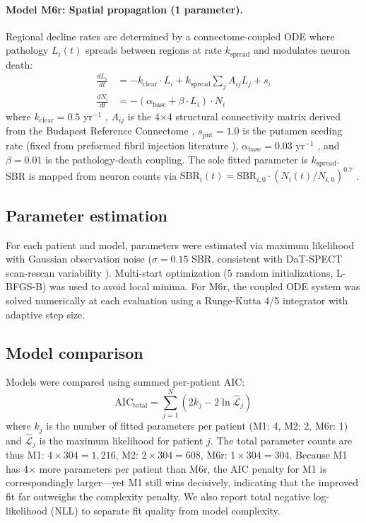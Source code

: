 \paragraph{Model M6r: Spatial propagation (1 parameter).}
Regional decline rates are determined by a connectome-coupled ODE where pathology $L_i(t)$ spreads between regions at rate $k_{\text{spread}}$ and modulates neuron death:
\begin{align}
\frac{dL_i}{dt} &= -k_{\text{clear}} \cdot L_i + k_{\text{spread}} \sum_j A_{ij} L_j + s_i \\
\frac{dN_i}{dt} &= -(\alpha_{\text{base}} + \beta \cdot L_i) \cdot N_i
\end{align}
where $k_{\text{clear}} = 0.5$ yr$^{-1}$ \cite{xu2024}, $A_{ij}$ is the 4$\times$4 structural connectivity matrix derived from the Budapest Reference Connectome \cite{schafer2021}, $s_{\text{put}} = 1.0$ is the putamen seeding rate (fixed from preformed fibril injection literature \cite{chu2019, patterson2019}), $\alpha_{\text{base}} = 0.03$ yr$^{-1}$ \cite{fearnley1991}, and $\beta = 0.01$ is the pathology-death coupling. The sole fitted parameter is $k_{\text{spread}}$. SBR is mapped from neuron counts via $\text{SBR}_i(t) = \text{SBR}_{i,0} \cdot (N_i(t)/N_{i,0})^{0.7}$ \cite{lee2019}.

\subsection{Parameter estimation}

For each patient and model, parameters were estimated via maximum likelihood with Gaussian observation noise ($\sigma = 0.15$ SBR, consistent with DaT-SPECT scan-rescan variability \cite{tossicibolt2017}). Multi-start optimization (5 random initializations, L-BFGS-B) was used to avoid local minima. For M6r, the coupled ODE system was solved numerically at each evaluation using a Runge-Kutta 4/5 integrator with adaptive step size.

\subsection{Model comparison}

Models were compared using summed per-patient AIC:
\begin{equation}
\text{AIC}_{\text{total}} = \sum_{j=1}^{N} \left( 2 k_j - 2 \ln \hat{\mathcal{L}}_j \right)
\end{equation}
where $k_j$ is the number of fitted parameters per patient (M1: 4, M2: 2, M6r: 1) and $\hat{\mathcal{L}}_j$ is the maximum likelihood for patient $j$. The total parameter counts are thus M1: $4 \times 304 = 1{,}216$, M2: $2 \times 304 = 608$, M6r: $1 \times 304 = 304$. Because M1 has 4$\times$ more parameters per patient than M6r, the AIC penalty for M1 is correspondingly larger---yet M1 still wins decisively, indicating that the improved fit far outweighs the complexity penalty. We also report total negative log-likelihood (NLL) to separate fit quality from model complexity.

